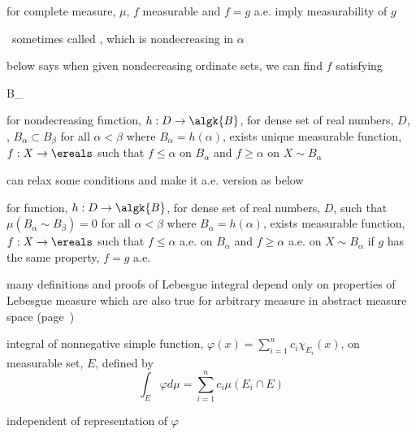 \documentclass[17pt,landscape]{foils}
\newcommand{\algB}{\algk{B}}
\begin{document}
{{	\vitem for complete measure, $\mu$,
		$f$ measurable and $f=g$ a.e. imply
		measurability of $g$
\eit



\bit
	\item {}\ sometimes called %
			,
		which is nondecreasing in $\alpha$

	\vitem below says when given nondecreasing ordinate sets,
		we can find $f$ satisfying

	\begin{eqn}
		\subset
		B_\alpha
		\subset
	\end{eqn}

	\vitem for nondecreasing function, $h:D\to\algB$, for dense set of real numbers, $D$,
		\ie, $B_\alpha \subset B_\beta$ for all $\alpha<\beta$ where $B_\alpha = h(\alpha)$,
		exists unique measurable function, $f:X\to\ereals$
		such that $f\leq \alpha$ on $B_\alpha$ and $f\geq \alpha$ on $X\sim B_\alpha$

	\vvitem can relax some conditions and make it a.e. version as below

	\vitem for function, $h:D\to\algB$, for dense set of real numbers, $D$,
		such that $\mu(B_\alpha\sim B_\beta)=0$ for all $\alpha < \beta$ where $B_\alpha = h(\alpha)$,
		exists measurable function, $f:X\to\ereals$
		such that $f\leq \alpha$ a.e. on $B_\alpha$ and $f\geq \alpha$ a.e. on $X\sim B_\alpha$%
	\bit
		\vitem if $g$ has the same property, $f=g$ a.e.
	\eit

\eit



\bit
	\item
		many definitions and proofs of Lebesgue integral
		depend only on properties of Lebesgue measure
		which are also true for arbitrary measure in abstract measure space
		(page~\pageref{title-page:lebesgue-integral})

	\vitem
		integral of nonnegative simple function, $\varphi(x) = \sum_{i=1}^n c_i \chi_{E_i}(x)$,
		on measurable set, $E$, defined by%
		\[
			\int_E \varphi d\mu= \sum_{i=1}^n c_i \mu (E_i \cap E)
		\]
	\bit
		\item independent of representation of $\varphi$
	\eit

}}
\end{document}
